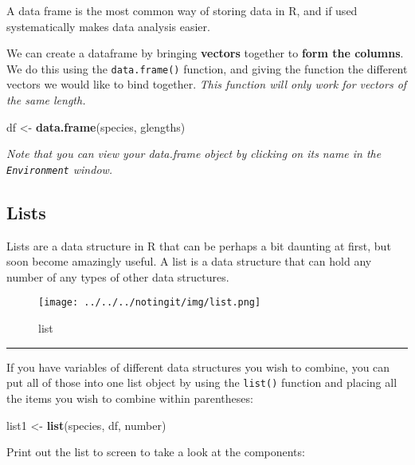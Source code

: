 \documentclass[
]{article}
\newenvironment{Shaded}{\begin{snugshade}}{\end{snugshade}}
\newcommand{\KeywordTok}[1]{\textcolor[rgb]{0.13,0.29,0.53}{\textbf{#1}}}
\newcommand{\NormalTok}[1]{#1}
\newcommand{\StringTok}[1]{\textcolor[rgb]{0.31,0.60,0.02}{#1}}
\begin{document}
A data frame is the most common way of storing data in R, and if used
systematically makes data analysis easier.

We can create a dataframe by bringing \textbf{vectors} together to
\textbf{form the columns}. We do this using the \texttt{data.frame()}
function, and giving the function the different vectors we would like to
bind together. \emph{This function will only work for vectors of the
same length.}

\begin{Shaded}
\begin{Highlighting}[]
\NormalTok{df <-}\StringTok{ }\KeywordTok{data.frame}\NormalTok{(species, glengths)}
\end{Highlighting}
\end{Shaded}

\emph{Note that you can view your data.frame object by clicking on its
name in the \texttt{Environment} window.}

\hypertarget{lists}{%
\subsection{Lists}\label{lists}}

Lists are a data structure in R that can be perhaps a bit daunting at
first, but soon become amazingly useful. A list is a data structure that
can hold any number of any types of other data structures.

\begin{figure}
\centering
\texttt{[image: ../../../notingit/img/list.png]}
\caption{list}
\end{figure}

\begin{center}\rule{0.5\linewidth}{0.5pt}\end{center}

If you have variables of different data structures you wish to combine,
you can put all of those into one list object by using the
\texttt{list()} function and placing all the items you wish to combine
within parentheses:

\begin{Shaded}
\begin{Highlighting}[]
\NormalTok{list1 <-}\StringTok{ }\KeywordTok{list}\NormalTok{(species, df, number)}
\end{Highlighting}
\end{Shaded}

Print out the list to screen to take a look at the components:
\end{document}
